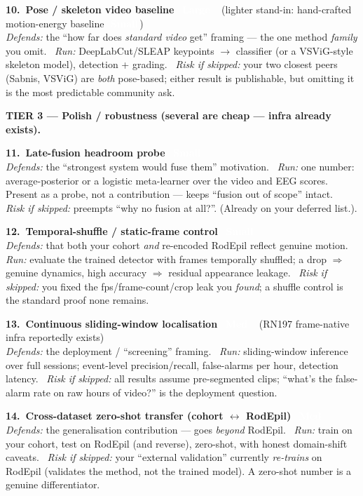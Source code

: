 \documentclass[11pt]{article}
\newcommand{\eff}[2]{\,\colorbox{#1}{\textcolor{white}{\scriptsize\bfseries\,#2\,}}}
\newcommand{\effS}{\eff{effS}{Small}}
\newcommand{\effM}{\eff{effM}{Med}}
\newcommand{\effL}{\eff{effL}{Large}}
\newcommand{\tier}[2]{%
  \vspace{6pt}\par\noindent{\color{#1}\rule{\linewidth}{2.2pt}}\par\vspace{1pt}%
  {\large\bfseries\color{#1} #2}\par\vspace{3pt}}
\newcommand{\dfd}[1]{{\itshape Defends:} #1.\ }
\newcommand{\run}[1]{{\itshape Run:} #1.\ }
\newcommand{\rsk}[1]{{\itshape Risk if skipped:} #1.}
\begin{document}
\begin{checks}
  \item \textbf{10.\ Pose / skeleton video baseline}\ \effL\ \ {\small(lighter stand-in: hand-crafted motion-energy baseline \effS)}\\
  \dfd{the ``how far does \emph{standard video} get'' framing --- the one method \emph{family} you omit}
  \run{DeepLabCut/SLEAP keypoints $\to$ classifier (or a VSViG-style skeleton model), detection + grading}
  \rsk{your two closest peers (Sabnis, VSViG) are \emph{both} pose-based; either result is publishable, but omitting it is the most predictable community ask}
\end{checks}

\tier{t3}{TIER 3 --- Polish / robustness (several are cheap --- infra already exists).}
\begin{checks}
  \item \textbf{11.\ Late-fusion headroom probe}\ \effS\\
  \dfd{the ``strongest system would fuse them'' motivation}
  \run{one number: average-posterior or a logistic meta-learner over the video and EEG scores. Present as a probe, not a contribution --- keeps ``fusion out of scope'' intact}
  \rsk{preempts ``why no fusion at all?''. (Already on your deferred list.)}

  \item \textbf{12.\ Temporal-shuffle / static-frame control}\ \effS\\
  \dfd{that both your cohort \emph{and} re-encoded RodEpil reflect genuine motion}
  \run{evaluate the trained detector with frames temporally shuffled; a drop $\Rightarrow$ genuine dynamics, high accuracy $\Rightarrow$ residual appearance leakage}
  \rsk{you fixed the fps/frame-count/crop leak you \emph{found}; a shuffle control is the standard proof none remains}

  \item \textbf{13.\ Continuous sliding-window localisation}\ \effM\ \ {\small(RN197 frame-native infra reportedly exists)}\\
  \dfd{the deployment / ``screening'' framing}
  \run{sliding-window inference over full sessions; event-level precision/recall, false-alarms per hour, detection latency}
  \rsk{all results assume pre-segmented clips; ``what's the false-alarm rate on raw hours of video?'' is the deployment question}

  \item \textbf{14.\ Cross-dataset zero-shot transfer (cohort $\leftrightarrow$ RodEpil)}\ \effM\\
  \dfd{the generalisation contribution --- goes \emph{beyond} RodEpil}
  \run{train on your cohort, test on RodEpil (and reverse), zero-shot, with honest domain-shift caveats}
  \rsk{your ``external validation'' currently \emph{re-trains} on RodEpil (validates the method, not the trained model). A zero-shot number is a genuine differentiator}


\end{checks}
\end{document}

